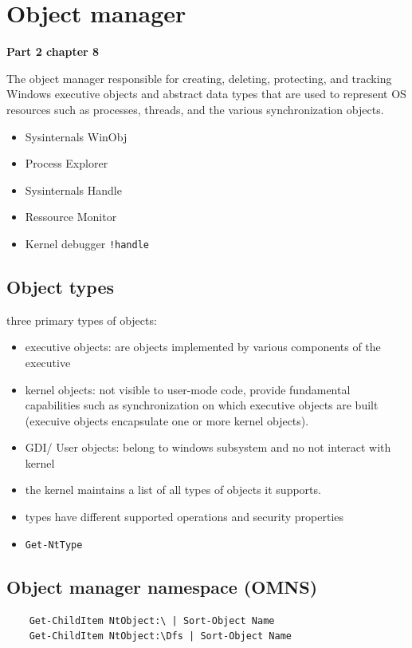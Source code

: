 \section{Object manager}
{\bf Part 2 chapter 8}

The object manager responsible for creating, deleting, protecting, and tracking Windows executive objects and abstract data types that are used to represent OS resources such as processes, threads, and the various synchronization objects.
\begin{itemize}
    \item Sysinternals WinObj
    \item Process Explorer
    \item Sysinternals Handle
    \item Ressource Monitor
    \item Kernel debugger \verb+!handle+
\end{itemize}


\subsection{Object types}
three primary types of objects: 
\begin{itemize}
    \item executive objects: are objects implemented by various components of the executive
    \item kernel objects: not visible to user-mode code, provide fundamental capabilities such as synchronization on which executive objects are built (execuive objects encapsulate one or more kernel objects).
    \item GDI/ User objects: belong to windows subsystem and no not interact with kernel
\end{itemize}


\begin{itemize}
    \item the kernel maintains a list of all types of objects it supports.
    \item types have different supported operations and security properties
    \item \verb+Get-NtType+ 
\end{itemize}

\subsection{Object manager namespace (OMNS)}
\begin{verbatim}
    Get-ChildItem NtObject:\ | Sort-Object Name
    Get-ChildItem NtObject:\Dfs | Sort-Object Name
\end{verbatim}


